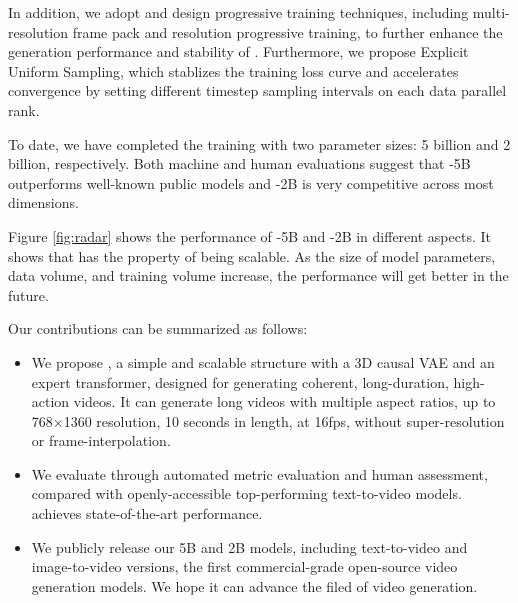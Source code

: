 In addition, we adopt and design progressive training techniques, including multi-resolution frame pack and resolution progressive training, to further enhance the generation performance and stability of \model. Furthermore, we propose Explicit Uniform Sampling, which stablizes the training loss curve and accelerates convergence by setting different timestep sampling intervals on each data parallel rank.

To date, we have completed the \model training with two parameter sizes: 5 billion and 2 billion, respectively. 
Both machine and human evaluations suggest that \model-5B outperforms well-known public models and \model-2B is very competitive across most dimensions. 

Figure \ref{fig:radar} shows the performance of \model-5B and \model-2B in different aspects. 
It shows that \model has the property of being scalable. As the size of model parameters, data volume, and training volume increase, the performance will get better in the future.

Our contributions can be summarized as follows:
\begin{itemize}
    \item We propose \model, a simple and scalable structure with a 3D causal VAE and an expert transformer, designed for generating coherent, long-duration, high-action videos. It can generate long videos with multiple aspect ratios, up to 768$\times$1360 resolution, 10 seconds in length, at 16fps, without super-resolution or frame-interpolation.
    \item We evaluate \model through automated metric evaluation and human assessment, compared with openly-accessible top-performing text-to-video models. \model achieves state-of-the-art performance.
    \item We publicly release our 5B and 2B models, including text-to-video and image-to-video versions, the first commercial-grade open-source video generation models. We hope it can advance the filed of video generation.
\end{itemize}



